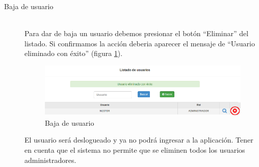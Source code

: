 \begin{description}
\item[Baja de usuario] \mbox{} \\
Para dar de baja un usuario debemos presionar el botón ``Eliminar'' del listado. Si confirmamos la acción deberia aparecer el mensaje de ``Usuario eliminado con éxito'' (figura \ref{fig:eliminar_usuario}).
\begin{figure}
\centerline{\includegraphics[width=1\textwidth]{eliminar_usuario.png}}
\caption{Baja de usuario}
\label{fig:eliminar_usuario}
\end{figure}
El usuario será deslogueado y ya no podrá ingresar a la aplicación. Tener en cuenta que el sistema no permite que se eliminen todos los usuarios administradores.

\end{description}